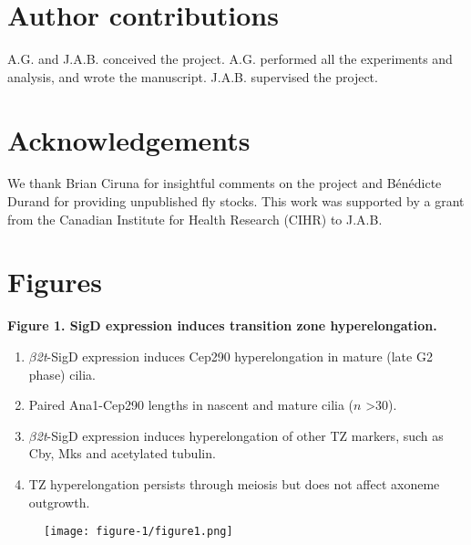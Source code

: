 \documentclass[12pt, twoside, letterpaper]{article}
\newcommand{\sigd}{$\beta$\textit{2t}-SigD}
\begin{document}
\section{Author contributions}
A.G. and J.A.B. conceived the project.
A.G. performed all the experiments and analysis, and wrote the manuscript.
J.A.B. supervised the project.


\section{Acknowledgements}
We thank Brian Ciruna for insightful comments on the project
and Bénédicte Durand for providing unpublished fly stocks.
This work was supported by a grant from the Canadian Institute for Health Research
(CIHR) to J.A.B.




\newpage
\section{Figures}

%
\textbf{Figure 1. SigD expression induces transition zone hyperelongation.}
\begin{enumerate}[label={(\Alph*)}, nolistsep]
\item \sigd{} expression induces Cep290 hyperelongation in mature (late G2 phase) cilia.
\item Paired Ana1-Cep290 lengths in nascent and mature cilia ($n$ \textgreater 30).
\item \sigd{} expression induces hyperelongation of other TZ markers, such as Cby, Mks
  and acetylated tubulin.
\item TZ hyperelongation persists through meiosis but does not affect
  axoneme outgrowth.
\end{enumerate}

\begin{figure}[ht]
  \texttt{[image: figure-1/figure1.png]}
\end{figure}
\newpage
\end{document}
